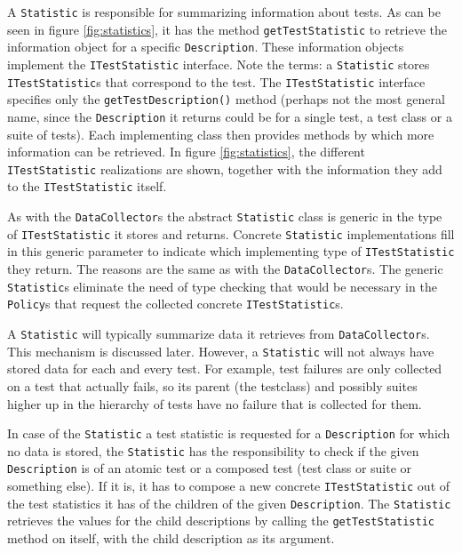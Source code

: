 \documentclass[i2]{oss}
\newcommand{\class}[1]{\texttt{#1}}
\newcommand{\method}[1]{\texttt{#1}}
\begin{document}
A \class{Statistic} is responsible for summarizing information about tests. As can be seen in figure \ref{fig:statistics}, it has the method \method{getTestStatistic} to retrieve the information object for a specific \class{Description}.
These information objects implement the \class{ITestStatistic} interface. Note the terms: a \class{Statistic} stores \class{ITestStatistic}s that correspond to the test.
The \class{ITestStatistic} interface specifies only the \method{getTestDescription()} method 
(perhaps not the most general name, since the \class{Description} it returns
could be for a single test, a test class or a suite of tests).
Each implementing class then provides methods by which more information can be retrieved. In figure \ref{fig:statistics}, the different \class{ITestStatistic} realizations are shown, together with the information they add to the \class{ITestStatistic} itself.

As with the \class{DataCollector}s the abstract \class{Statistic} class
is generic in the type of \class{ITestStatistic} it stores and returns. Concrete \class{Statistic} implementations fill in this generic parameter to indicate which implementing
type of \class{ITestStatistic} they return. The reasons are the same as with the \class{DataCollector}s. The generic \class{Statistic}s eliminate the need of type 
checking that would be necessary in the \class{Policy}s that request the collected concrete \class{ITestStatistic}s.

A \class{Statistic} will typically summarize data it retrieves from \class{DataCollector}s. This mechanism is discussed later. However, a \class{Statistic} will not always have stored data for each and every test. For example, test failures are only collected on a test that actually fails, so its parent (the testclass) and possibly suites higher up in the hierarchy of tests have no failure that is collected for them. 

In case of the \class{Statistic} a test statistic is requested for a \class{Description} for which no data is stored, the \class{Statistic} has the responsibility to check if the given \class{Description} is of an atomic test or a composed test (test class or suite or something else). If it is, it has to compose a new concrete \class{ITestStatistic} out of the test statistics it has of the children of the given \class{Description}. The \class{Statistic} retrieves the values for the child descriptions by calling the \method{getTestStatistic} method on itself, with the child description as its argument.
\end{document}
